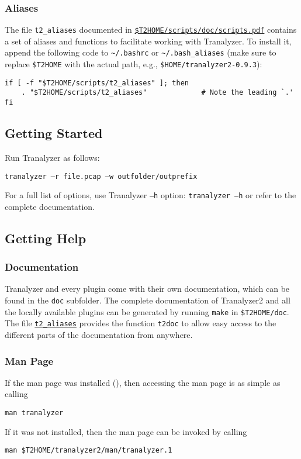 \subsubsection{Aliases}\label{s:aliases}
The file {\tt t2\_aliases} documented in \href{../../scripts/doc/scripts.pdf}{\tt \$T2HOME/scripts/doc/scripts.pdf} contains a set of aliases and functions to facilitate working with Tranalyzer.
To install it, append the following code to {\tt\textasciitilde{}/.bashrc} or {\tt\textasciitilde{}/.bash\_aliases} (make sure to replace {\tt\$T2HOME} with the actual path, e.g., {\tt\$HOME/tranalyzer2-0.9.3}):
\begin{lstlisting}
if [ -f "$T2HOME/scripts/t2_aliases" ]; then
    . "$T2HOME/scripts/t2_aliases"             # Note the leading `.'
fi
\end{lstlisting}

\subsection{Getting Started}

Run Tranalyzer as follows:
\begin{center}
    {\tt tranalyzer --r file.pcap --w outfolder/outprefix}
\end{center}
For a full list of options, use Tranalyzer {\tt --h} option: {\tt tranalyzer --h} or refer to the complete documentation.

\subsection{Getting Help}

\subsubsection{Documentation}
Tranalyzer and every plugin come with their own documentation, which can be found in the {\tt doc} subfolder. The complete documentation of Tranalyzer2 and all the locally available plugins can be generated by running {\tt make} in {\tt \$T2HOME/doc}. The file \hyperref[s:aliases]{\tt t2\_aliases} provides the function {\tt t2doc} to allow easy access to the different parts of the documentation from anywhere.

\subsubsection{Man Page}
If the man page was installed (), then accessing the man page is as simple as calling
\begin{center}
    {\tt man tranalyzer}
\end{center}
If it was not installed, then the man page can be invoked by calling
\begin{center}
    {\tt man \$T2HOME/tranalyzer2/man/tranalyzer.1}
\end{center}

